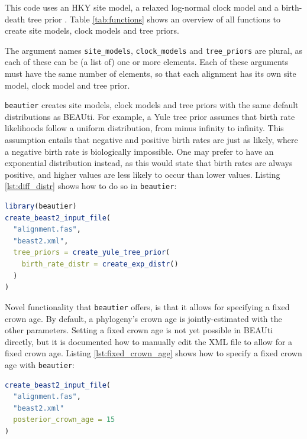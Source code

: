 \documentclass{article}
\begin{document}
This code uses an HKY site model, a relaxed log-normal clock model and a birth-death tree prior \cite{kendall1948generalized}.
Table \ref{tab:functions} shows an overview of all functions to create site models, clock models and tree priors.

The argument names \verb;site_models;, \verb;clock_models; and \verb;tree_priors; are plural, as each of these
can be (a list of) one or more elements. Each of these arguments must have the same number of elements, so that each alignment has its
own site model, clock model and tree prior. 

\verb;beautier; creates site models, clock models and tree priors with the same default distributions as BEAUti.
For example, a Yule tree prior assumes that birth rate likelihoods follow a uniform distribution, from minus infinity
to infinity. This assumption entails that negative and positive birth rates are just as likely, where a negative birth rate is biologically impossible. 
One may prefer to have an exponential distribution instead, as this would state that birth rates are always positive, and
higher values are less likely to occur than lower values. 
Listing \ref{lst:diff_distr} shows how to do so in \verb;beautier;:

\begin{lstlisting}[language=R, caption=Example with Yule tree prior with different birth rate distribution, label=lst:diff_distr, floatplacement=H]
library(beautier)
create_beast2_input_file(
  "alignment.fas",
  "beast2.xml",
  tree_priors = create_yule_tree_prior(
    birth_rate_distr = create_exp_distr()    
  )
)
\end{lstlisting}

Novel functionality that \verb;beautier; offers, is that it allows for specifying a fixed crown age. 
By default, a phylogeny's crown age is jointly-estimated with the other parameters.
Setting a fixed crown age is not yet possible in BEAUti directly, but it is documented how to 
manually edit the XML file to allow for a fixed crown age. 
Listing \ref{lst:fixed_crown_age} shows how to specify a fixed crown age with \verb;beautier;:

\begin{lstlisting}[language=R, caption=Example with fixed crown age, label=lst:fixed_crown_age, floatplacement=H]
create_beast2_input_file(
  "alignment.fas",
  "beast2.xml"
  posterior_crown_age = 15
)
\end{lstlisting}

\end{document}
